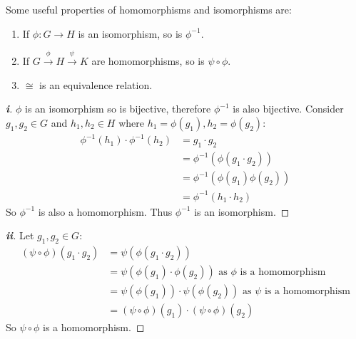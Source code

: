 \documentclass[../main.tex]{subfiles}
\begin{document}
\begin{proposition}
  Some useful properties of homomorphisms and isomorphisms are:
  \begin{enumerate}
    \item If $\phi: G \to H$ is an isomorphism, so is $\phi^{-1}$.
    \item If $G \xrightarrow{\phi} H \xrightarrow{\psi} K$ are homomorphisms, so is $\psi \circ \phi$.
    \item $\cong$ is an equivalence relation.
  \end{enumerate}
\end{proposition}
\begin{proof}[\textbf{i}]
  $\phi$ is an isomorphism so is bijective, therefore $\phi^{-1}$ is also bijective.
  Consider $g_1, g_2 \in G$ and $h_1, h_2 \in H$ where $h_1 = \phi(g_1), h_2 = \phi(g_2)$:
  \begin{align*}
    \phi^{-1}(h_1) \cdot \phi^{-1}(h_2) &= g_1 \cdot g_2 \\
                                        &= \phi^{-1}(\phi(g_1 \cdot g_2)) \\
                                        &= \phi^{-1}(\phi(g_1)\phi(g_2)) \\
                                        &= \phi^{-1}(h_1 \cdot h_2)
  \end{align*}
  So $\phi^{-1}$ is also a homomorphism.
  Thus $\phi^{-1}$ is an isomorphism.
\end{proof}
\begin{proof}[\textbf{ii}]
  Let $g_1, g_2 \in G$:
  \begin{align*}
    (\psi \circ \phi)(g_1 \cdot g_2) &= \psi(\phi(g_1 \cdot g_2)) \\
                                     &= \psi(\phi(g_1) \cdot \phi(g_2)) \text{ as $\phi$ is a homomorphism} \\
                                     &= \psi(\phi(g_1)) \cdot \psi(\phi(g_2)) \text{ as $\psi$ is a homomorphism}\\
                                     &= (\psi \circ \phi)(g_1) \cdot (\psi \circ \phi)(g_2)
  \end{align*}
So $\psi \circ \phi$ is a homomorphism.
\end{proof}
\end{document}
